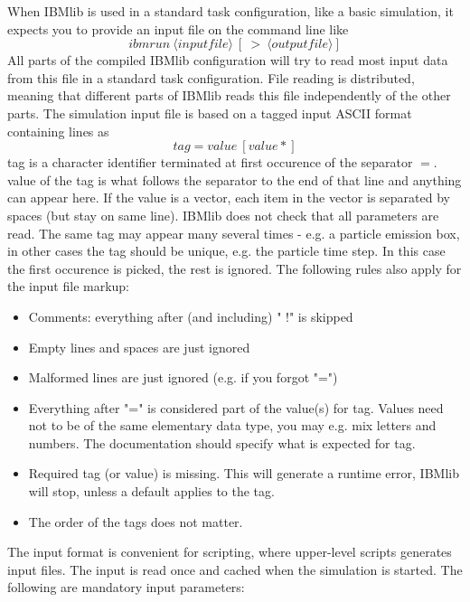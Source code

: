 When IBMlib is used in a standard task configuration, like a basic simulation, 
it expects you to provide an input file on the command line like
\[ ibmrun \ \langle inputfile \rangle \ [ \ > \  \langle outputfile \rangle]
\]
All parts of the compiled IBMlib configuration will try to 
read most input data from this file in a standard task configuration.
File reading is distributed, meaning that different parts of IBMlib
reads this file independently of the other parts.
The simulation input file is based on
a tagged input ASCII format containing lines as 
\begin{equation}
tag = value \ [value*] \nonumber
\end{equation}
tag is a character identifier terminated at first occurence of 
the separator $=$. value of the tag is what follows the separator to the end of that 
line and anything can appear here. If the value is a vector, each item in the vector
is separated by spaces (but stay on same line).
IBMlib does not check that all parameters are read.
The same tag may appear many several times - e.g. a particle emission box,
in other cases the tag should be unique, e.g. the particle time step. In this case
the first occurence is picked, the rest is ignored.
The following rules also apply for the input file markup:
\begin{itemize}
  \item Comments: everything after (and including) " !" is skipped
  \item Empty lines and spaces are just ignored
  \item Malformed lines are just ignored (e.g. if you forgot "=")
  \item Everything after "=" is considered part of the value(s) for tag.
        Values need not to be of the same elementary data type, you may
        e.g. mix letters and numbers. The documentation should specify what is
        expected for tag.
  \item Required tag (or value) is missing. This will generate a runtime
        error, IBMlib will stop, unless a default applies to the tag.
  \item The order of the tags does not matter. 
\end{itemize}  

The input format is convenient for scripting, where upper-level  
scripts generates input files. The input is read once and cached
when the simulation is started.
The following are mandatory input parameters:

